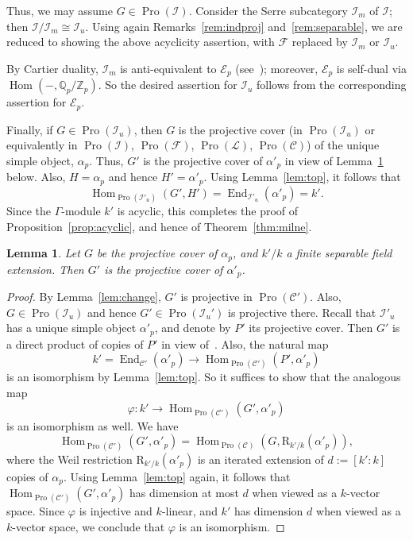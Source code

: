\documentclass[11pt]{article}
\newtheorem{lemm}[theo]{Lemma}
\theoremstyle{definition}
\numberwithin{equation}{section}
\newcommand\bQ{{\mathbb Q}}
\newcommand\bZ{{\mathbb Z}}
\newcommand\cC{{\mathcal C}}
\newcommand\cE{{\mathcal E}}
\newcommand\cF{{\mathcal F}}
\newcommand\cI{{\mathcal I}}
\newcommand\cL{{\mathcal L}}
\newcommand\R{\mathrm{R}}
\DeclareMathOperator{\End}{End}
\DeclareMathOperator{\Hom}{Hom}
\DeclareMathOperator{\Pro}{Pro}
\theoremstyle{remark}
\newcommand*{\MK}{\mkern 2mu}
\begin{document}
Thus, we may assume $G \in \Pro(\cI)$. Consider the Serre subcategory $\cI_m$ of $\cI$; then $\cI/\cI_m \cong \cI_u$. Using again Remarks~\ref{rem:indproj} and~\ref{rem:separable}, we are reduced to showing the above acyclicity assertion, with $\cF$ replaced by $\cI_m$ or $\cI_u$.

By Cartier duality, $\cI_m$ is anti-equivalent to $\cE_p$ (see~\cite[IV.1.3]{DG}); moreover, $\cE_p$ is self-dual via $\Hom(-, \bQ_p/\bZ_p)$. So the desired assertion for $\cI_u$ follows from the corresponding assertion for $\cE_p$.

Finally, if $G \in \Pro(\cI_u)$, then $G$ is the projective cover (in $\Pro(\cI_u)$ or equivalently in $\Pro(\cI)$, $\Pro(\cF)$, $\Pro(\cL)$, $\Pro(\cC)$) of the unique simple object, $\alpha_p$. Thus, $G'$ is the projective cover of $\alpha'_p$ in view of Lemma~\ref{lem:cov} below. Also, $H = \alpha_p$ and hence $H' = \alpha'_p$. Using Lemma~\ref{lem:top}, it follows that
\[
\Hom_{\Pro(\cI'_u)}(G', H') =
\End_{\cI'_u}(\alpha'_p) = k'.
\]
Since the $\Gamma$-module $k'$ is acyclic, this completes the proof of Proposition~\ref{prop:acyclic}, and hence of Theorem~\ref{thm:milne}.


\begin{lemm}\label{lem:cov}
Let $G$ be the projective cover of $\alpha_p$, and $k'/k$ a finite separable field extension. Then $G'$ is the projective cover of $\alpha'_p$.
\end{lemm}

\begin{proof}
By Lemma~\ref{lem:change}, $G'$ is projective in $\Pro(\cC')$. Also, $G \in \Pro(\cI_u)$ and hence $G' \in \Pro(\cI_u')$ is projective there. Recall that $\cI'_u$ has a unique simple object $\alpha'_p$, and denote by $P'$ its projective cover. Then $G'$ is a direct product of copies of $P'$ in view of~\cite[V.2.4.6$\MK$b)]{DG}. Also, the natural map
\[
k' = \End_{\cC'}(\alpha'_p) \longrightarrow
\Hom_{\Pro(\cC')}(P', \alpha'_p)
\]
is an isomorphism by Lemma~\ref{lem:top}. So it suffices to show that the analogous map
\[
\varphi : k' \longrightarrow
\Hom_{\Pro(\cC')}(G', \alpha'_p)
\]
is an isomorphism as well. We have
\[
\Hom_{\Pro(\cC')}(G', \alpha'_p) =
\Hom_{\Pro(\cC)}(G, \R_{k'/k}(\alpha'_p)),
\]
where the Weil restriction $\R_{k'/k}(\alpha'_p)$ is an iterated extension of $d := [k':k]$ copies of $\alpha_p$. Using Lemma~\ref{lem:top} again, it follows that $\Hom_{\Pro(\cC')}(G', \alpha'_p)$ has dimension at most $d$ when viewed as a $k$-vector space. Since $\varphi$ is injective and $k$-linear, and $k'$ has dimension $d$ when viewed as a $k$-vector space, we conclude that $\varphi$ is an isomorphism.
\end{proof}
\end{document}
